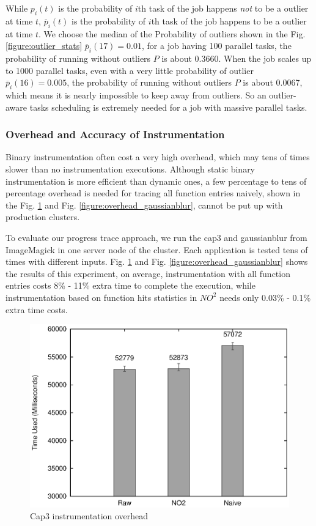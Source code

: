 While $p_i(t)$ is the probability of $i$th task of the job happens \emph{not} to be a
outlier at time $t$, $\overline{p}_i(t)$ is the probability of $i$th task of the job
happens to be a outlier at time $t$. We choose the median of the Probability of outliers
shown in the Fig. \ref{figure:outlier_stats} $\overline{p}_i(17) = 0.01$, for a job having
100 parallel tasks, the probability of running without outliers $P$ is about 0.3660. When
the job scales up to 1000 parallel tasks, even with a very little probability of outlier
$\overline{p}_i(16) = 0.005$, the probability of running without outliers $P$ is about
0.0067, which means it is nearly impossible to keep away from outliers. So an
outlier-aware tasks scheduling is extremely needed for a job with massive parallel tasks.

\subsubsection{Overhead and Accuracy of Instrumentation}

Binary instrumentation often cost a very high overhead, which may tens of times slower
than no instrumentation executions. Although static binary instrumentation is more
efficient than dynamic ones, a few percentage to tens of percentage overhead is needed for
tracing all function entries naively, shown in the Fig. \ref{figure:overhead_cap3} and
Fig. \ref{figure:overhead_gaussianblur}, cannot be put up with production clusters.

To evaluate our progress trace approach, we run the cap3 and gaussianblur from ImageMagick
in one server node of the cluster. Each application is tested tens of times with different
inputs. Fig. \ref{figure:overhead_cap3} and Fig. \ref{figure:overhead_gaussianblur} shows
the results of this experiment, on average, instrumentation with all function entries
costs 8\% - 11\% extra time to complete the execution, while instrumentation based on
function hits statistics in $NO^2$ needs only 0.03\% - 0.1\% extra time costs.

\begin{figure}
\centering
  \includegraphics[width=0.9\columnwidth]{figures/overhead_cap3.eps}
\caption{Cap3 instrumentation overhead}
\label{figure:overhead_cap3}
\end{figure}

